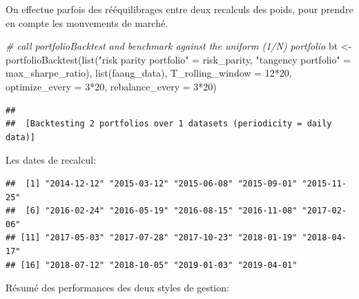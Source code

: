 \documentclass[
]{article}
\newenvironment{Shaded}{\begin{snugshade}}{\end{snugshade}}
\newcommand{\AttributeTok}[1]{\textcolor[rgb]{0.77,0.63,0.00}{#1}}
\newcommand{\CommentTok}[1]{\textcolor[rgb]{0.56,0.35,0.01}{\textit{#1}}}
\newcommand{\DecValTok}[1]{\textcolor[rgb]{0.00,0.00,0.81}{#1}}
\newcommand{\FunctionTok}[1]{\textcolor[rgb]{0.00,0.00,0.00}{#1}}
\newcommand{\NormalTok}[1]{#1}
\newcommand{\OtherTok}[1]{\textcolor[rgb]{0.56,0.35,0.01}{#1}}
\newcommand{\SpecialCharTok}[1]{\textcolor[rgb]{0.00,0.00,0.00}{#1}}
\newcommand{\StringTok}[1]{\textcolor[rgb]{0.31,0.60,0.02}{#1}}
\begin{document}
On effectue parfois des rééquilibrages entre deux recalculs des poids,
pour prendre en compte les mouvements de marché.

\begin{Shaded}
\begin{Highlighting}[]
\CommentTok{\# call portfolioBacktest and benchmark against the uniform (1/N) portfolio}
\NormalTok{bt }\OtherTok{\textless{}{-}} \FunctionTok{portfolioBacktest}\NormalTok{(}\FunctionTok{list}\NormalTok{(}\StringTok{"risk parity portfolio"} \OtherTok{=}\NormalTok{ risk\_parity,}
                             \StringTok{"tangency portfolio"}    \OtherTok{=}\NormalTok{ max\_sharpe\_ratio),}
                        \FunctionTok{list}\NormalTok{(faang\_data),}
                        \AttributeTok{T\_rolling\_window =} \DecValTok{12}\SpecialCharTok{*}\DecValTok{20}\NormalTok{, }
                        \AttributeTok{optimize\_every =} \DecValTok{3}\SpecialCharTok{*}\DecValTok{20}\NormalTok{, }\AttributeTok{rebalance\_every =} \DecValTok{3}\SpecialCharTok{*}\DecValTok{20}\NormalTok{)}
\end{Highlighting}
\end{Shaded}

\begin{verbatim}
## 
##  [Backtesting 2 portfolios over 1 datasets (periodicity = daily data)]
\end{verbatim}

Les dates de recalcul:

\begin{Shaded}
\end{Shaded}

\begin{verbatim}
##  [1] "2014-12-12" "2015-03-12" "2015-06-08" "2015-09-01" "2015-11-25"
##  [6] "2016-02-24" "2016-05-19" "2016-08-15" "2016-11-08" "2017-02-06"
## [11] "2017-05-03" "2017-07-28" "2017-10-23" "2018-01-19" "2018-04-17"
## [16] "2018-07-12" "2018-10-05" "2019-01-03" "2019-04-01"
\end{verbatim}

Résumé des performances des deux styles de gestion:

\begin{Shaded}
\end{Shaded}
\end{document}
